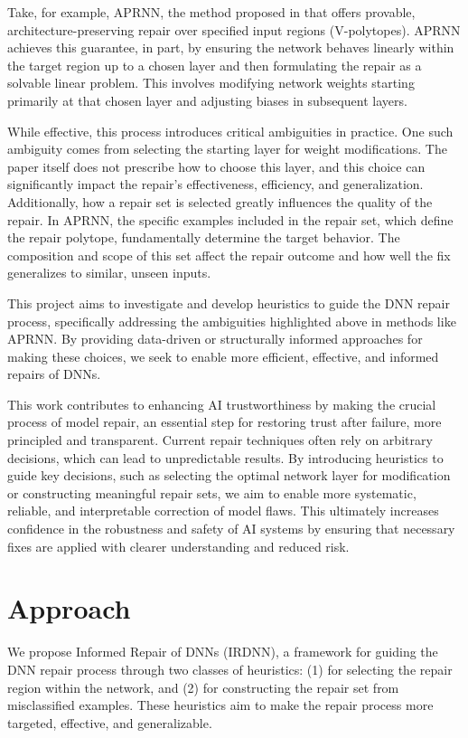 \documentclass{article}
\begin{document}
Take, for example, APRNN, the method proposed in \cite{tao_architecture-preserving_2023} that offers provable, architecture-preserving repair over specified input regions (V-polytopes).
APRNN achieves this guarantee, in part, by ensuring the network behaves linearly within the target region up to a chosen layer and then formulating the repair as a solvable linear problem.
This involves modifying network weights starting primarily at that chosen layer and adjusting biases in subsequent layers.

While effective, this process introduces critical ambiguities in practice.
One such ambiguity comes from selecting the starting layer for weight modifications.
The paper itself does not prescribe how to choose this layer, and this choice can significantly impact the repair's effectiveness, efficiency, and generalization.
Additionally, how a repair set is selected greatly influences the quality of the repair.
In APRNN, the specific examples included in the repair set, which define the repair polytope, fundamentally determine the target behavior.
The composition and scope of this set affect the repair outcome and how well the fix generalizes to similar, unseen inputs.

This project aims to investigate and develop heuristics to guide the DNN repair process, specifically addressing the ambiguities highlighted above in methods like APRNN.
By providing data-driven or structurally informed approaches for making these choices, we seek to enable more efficient, effective, and informed repairs of DNNs.

This work contributes to enhancing AI trustworthiness by making the crucial process of model repair, an essential step for restoring trust after failure, more principled and transparent.
Current repair techniques often rely on arbitrary decisions, which can lead to unpredictable results.
By introducing heuristics to guide key decisions, such as selecting the optimal network layer for modification or constructing meaningful repair sets, we aim to enable more systematic, reliable, and interpretable correction of model flaws.
This ultimately increases confidence in the robustness and safety of AI systems by ensuring that necessary fixes are applied with clearer understanding and reduced risk.

\section{Approach}

We propose Informed Repair of DNNs (IRDNN), a framework for guiding the DNN repair process through two classes of heuristics: (1) for selecting the repair region within the network, and (2) for constructing the repair set from misclassified examples.
These heuristics aim to make the repair process more targeted, effective, and generalizable.
\end{document}
